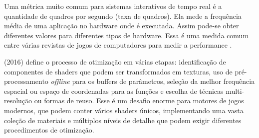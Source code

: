 Uma métrica muito comum para sistemas interativos de tempo real é a quantidade de quadros por segundo (taxa de quadros). Ela mede a frequência média de uma aplicação no hardware onde é executada. Assim pode-se obter diferentes valores para diferentes tipos de hardware. Essa é uma medida comum entre várias revistas de jogos de computadores para medir a performance \cite{rehfeld2014profile}.

 (2016) define o processo de otimização em várias etapas: identificação de componentes de shaders que podem ser transformados em texturas, uso de pré-processamento \textit{offline} para os buffers de parâmetros, seleção da melhor frequência espacial ou espaço de coordenadas para as funções e escolha de técnicas multi-resolução ou formas de reuso. Esse é um desafio enorme para motores de jogos modernos, que podem conter vários shaders únicos, implementando uma vasta coleção de materiais e múltiplos níveis de detalhe que podem exigir diferentes procedimentos de otimização.
